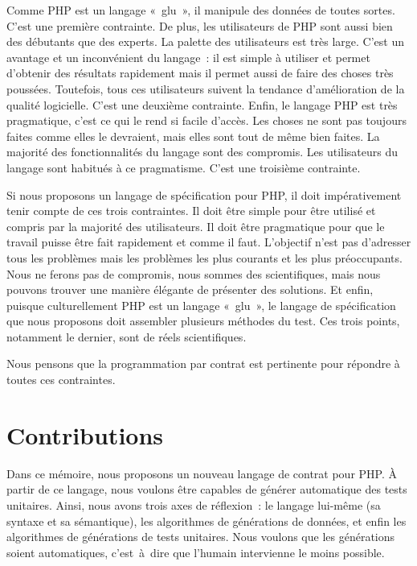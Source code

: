 Comme PHP est un langage «~glu~», il manipule des données de toutes sortes.
C'est une première contrainte. De plus, les utilisateurs de PHP sont aussi bien
des débutants que des experts. La palette des utilisateurs est très large. C'est
un avantage et un inconvénient du langage~: il est simple à utiliser et permet
d'obtenir des résultats rapidement mais il permet aussi de faire des choses très
poussées. Toutefois, tous ces utilisateurs suivent la tendance d'amélioration de
la qualité logicielle. C'est une deuxième contrainte. Enfin, le langage PHP est
très pragmatique, c'est ce qui le rend si facile d'accès. Les choses ne sont pas
toujours faites comme elles le devraient, mais elles sont tout de même bien
faites. La majorité des fonctionnalités du langage sont des compromis. Les
utilisateurs du langage sont habitués à ce pragmatisme. C'est une troisième
contrainte.

Si nous proposons un langage de spécification pour PHP, il doit impérativement
tenir compte de ces trois contraintes. Il doit être simple pour être utilisé et
compris par la majorité des utilisateurs. Il doit être pragmatique pour que le
travail puisse être fait rapidement et comme il faut. L'objectif n'est pas
d'adresser tous les problèmes mais les problèmes les plus courants et les plus
préoccupants. Nous ne ferons pas de compromis, nous sommes des scientifiques,
mais nous pouvons trouver une manière élégante de présenter des solutions. Et
enfin, puisque culturellement PHP est un langage «~glu~», le langage de
spécification que nous proposons doit assembler plusieurs méthodes du test. Ces
trois points, notamment le dernier, sont de réels 
scientifiques.

Nous pensons que la programmation par contrat est pertinente pour répondre à
toutes ces contraintes.

\section{Contributions}
\label{section:introduction:contributions}

Dans ce mémoire, nous proposons un nouveau langage de contrat pour PHP. À partir
de ce langage, nous voulons être capables de générer automatique des tests
unitaires. Ainsi, nous avons trois axes de réflexion~: le langage lui-même (sa
syntaxe et sa sémantique), les algorithmes de générations de données, et enfin
les algorithmes de générations de tests unitaires. Nous voulons que les
générations soient automatiques, c'est~à~dire que l'humain intervienne le moins
possible.

